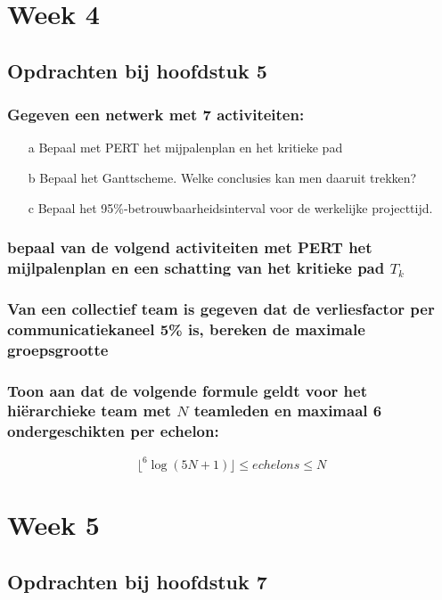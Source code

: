 \documentclass[a4paper,titlepage]{artikel1}
\begin{document}
   \section{Week 4}
   \subsection{Opdrachten bij hoofdstuk 5}
   \subsubsection[Opdracht 1]{Gegeven een netwerk met 7 activiteiten:}
   \begin{itemize}
     \item[a] Bepaal met PERT het mijpalenplan en het kritieke pad
     \item[b] Bepaal het Ganttscheme. Welke conclusies kan men daaruit trekken?
     \item[c] Bepaal het 95\%-betrouwbaarheidsinterval voor de werkelijke projecttijd.
   \end{itemize}

   \subsubsection[Opdracht 2]{bepaal van de volgend activiteiten met PERT het mijlpalenplan en een schatting van het kritieke pad $T_k$}

   \subsubsection[Opdracht 3]{Van een collectief team is gegeven dat de verliesfactor per communicatiekaneel 5\% is, bereken de maximale groepsgrootte}

   \subsubsection[Opdracht 4]{Toon aan dat de volgende formule geldt voor het hi\"{e}rarchieke team met $N$ teamleden en maximaal 6 ondergeschikten per echelon:}
   \begin{displaymath}
     \lfloor^6\log{(5N+1)}\rfloor\leq echelons\leq N
   \end{displaymath}

   \section{Week 5}
   \subsection{Opdrachten bij hoofdstuk 7}
\end{document}
